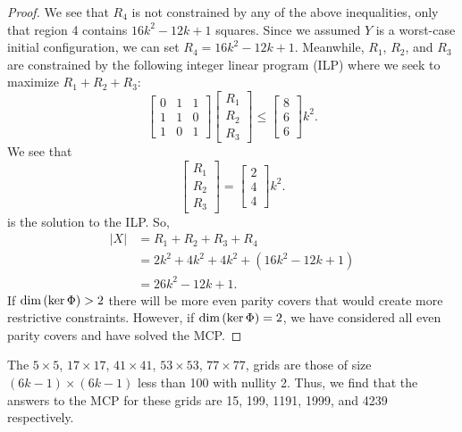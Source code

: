 \documentclass[a4paper]{article}
\newcommand{\abs}[1]{\left| #1 \right|}
\renewcommand{\dim}[1]{\textnormal{dim}\left( #1 \right)}
\begin{document}
\begin{proof}
		We see that $R_4$ is not constrained by any of the above inequalities, only that region 4 contains $16k^2 - 12k + 1$ squares.
		Since we assumed $Y$ is a worst-case initial configuration, we can set $R_4 = 16k^2 - 12k + 1$.
		Meanwhile, $R_1$, $R_2$, and $R_3$ are constrained by the following integer linear program (ILP) where we seek to maximize $R_1 + R_2 + R_3$:
		\begin{equation*}
			\begin{bmatrix}
				0 & 1 & 1 \\
				1 & 1 & 0 \\
				1 & 0 & 1 
			\end{bmatrix}
			\begin{bmatrix}
				R_1 \\
				R_2 \\
				R_3
			\end{bmatrix}
			\leq
			\begin{bmatrix}
				8 \\
				6 \\
				6
			\end{bmatrix}k^2.
		\end{equation*}
		We see that
		\begin{equation*}
			\begin{bmatrix}
				R_1 \\
				R_2 \\
				R_3
			\end{bmatrix}
			=
			\begin{bmatrix}
				2 \\
				4 \\
				4
			\end{bmatrix}k^2.
		\end{equation*}
		is the solution to the ILP.
		So,
		\begin{align*}
			\abs{X} &=  R_1 + R_2 + R_3 + R_4 \\
				&= 2k^2 + 4k^2 +  4k^2 + (16k^2 - 12k + 1) \\
				&= 26k^2 - 12k + 1.
		\end{align*}
		If $\dim{\ker{\Phi}} > 2$ there will be more even parity covers that would create more restrictive constraints.
		However, if $\dim{\ker{\Phi}} = 2$, we have considered all even parity covers and have solved the MCP.
	\end{proof}

	The $5 \times 5$, $17 \times 17$, $41 \times 41$, $53 \times 53$, $77 \times 77$, grids are those of size $(6k-1) \times (6k-1)$ less than 100 with nullity 2.
	Thus, we find that the answers to the MCP for these grids are 15, 199, 1191, 1999, and 4239 respectively.
	
\end{document}
